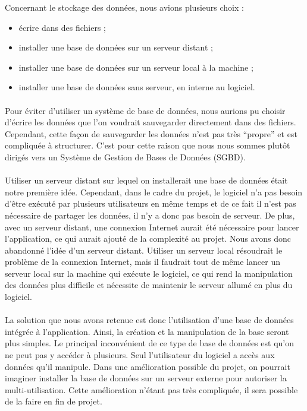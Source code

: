Concernant le stockage des données, nous avions plusieurs choix :
\begin{itemize}
\item écrire dans des fichiers ;
\item installer une base de données sur un serveur distant ;
\item installer une base de données sur un serveur local à la machine ;
\item installer une base de données sans serveur, en interne au logiciel.
\end{itemize}

\paragraph{}
Pour éviter d’utiliser un système de base de données, nous aurions pu choisir
d’écrire les données que l’on voudrait sauvegarder directement dans des
fichiers. Cependant, cette façon de sauvegarder les données n’est pas très
“propre” et est compliquée à structurer. C’est pour cette raison que nous nous
sommes plutôt dirigés vers un Système de Gestion de Bases de Données (SGBD).

\paragraph{}
Utiliser un serveur distant sur lequel on installerait une base de données était 
notre première idée. Cependant, dans le cadre du projet, le logiciel n'a pas
besoin d’être exécuté par plusieurs utilisateurs en même temps et de ce fait il n’est 
pas nécessaire de partager les données, il n’y a donc pas besoin de serveur. De plus, 
avec un serveur distant, une connexion Internet aurait été nécessaire pour lancer 
l’application, ce qui aurait ajouté de la complexité au projet. Nous avons donc 
abandonné l’idée d’un serveur distant. Utiliser un serveur local résoudrait le problème 
de la connexion Internet, mais il faudrait tout de même lancer un serveur local 
sur la machine qui exécute le logiciel, ce qui rend la manipulation des données
plus difficile et nécessite de maintenir le serveur allumé en plus du logiciel.

\paragraph{}
La solution que nous avons retenue est donc l’utilisation d’une base de données
intégrée à l’application. Ainsi, la création et la manipulation de la base
seront plus simples. Le principal inconvénient de ce type de base de données est
qu’on ne peut pas y accéder à plusieurs. Seul l’utilisateur du logiciel a accès
aux données qu’il manipule. Dans une amélioration possible du projet, on
pourrait imaginer installer la base de données sur un serveur externe pour
autoriser la multi-utilisation. Cette amélioration n’étant pas très compliquée,
il sera possible de la faire en fin de projet.

